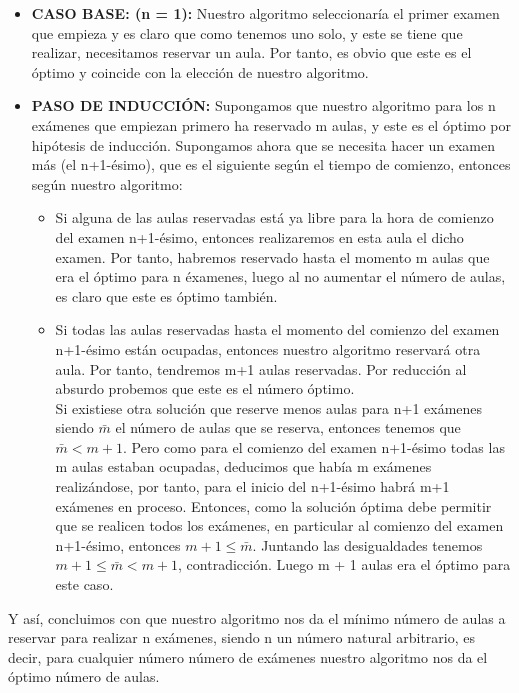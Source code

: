 \documentclass{article}
\begin{document}
    \begin{itemize}
        \item \textbf{CASO BASE: (n = 1): } Nuestro algoritmo seleccionaría el primer examen que empieza y es claro que como tenemos uno solo, y este se tiene que realizar, necesitamos reservar un aula. Por tanto, es obvio que este es el óptimo y coincide con la elección de nuestro algoritmo.

        \item \textbf{PASO DE INDUCCIÓN: } Supongamos que nuestro algoritmo para los n exámenes que empiezan primero ha reservado m aulas, y este es el óptimo por hipótesis de inducción. Supongamos ahora que se necesita hacer un examen más (el n+1-ésimo), que es el siguiente según el tiempo de comienzo, entonces según nuestro algoritmo: \\
        \begin{itemize}
            \item Si alguna de las aulas reservadas está ya libre para la hora de comienzo del examen n+1-ésimo, entonces realizaremos en esta aula el dicho examen. Por tanto, habremos reservado hasta el momento m aulas que era el óptimo para n éxamenes, luego al no aumentar el número de aulas, es claro que este es óptimo también.
            \item Si todas las aulas reservadas hasta el momento del comienzo del examen n+1-ésimo están ocupadas, entonces nuestro algoritmo reservará otra aula. Por tanto, tendremos m+1 aulas reservadas. Por reducción al absurdo probemos que este es el número óptimo. \\
            Si existiese otra solución que reserve menos aulas para n+1 exámenes siendo $\bar{m}$ el número de aulas que se reserva, entonces tenemos que $\bar{m} < m+1$. Pero como para el comienzo del examen n+1-ésimo todas las m aulas estaban ocupadas, deducimos que había m exámenes realizándose, por tanto, para el inicio del n+1-ésimo habrá m+1 exámenes en proceso. Entonces, como la solución óptima debe permitir que se realicen todos los exámenes, en particular al comienzo del examen n+1-ésimo, entonces $ m + 1 \leq \bar{m}$. Juntando las desigualdades tenemos $ m + 1 \leq \bar{m} < m + 1$, contradicción. Luego m + 1 aulas era el óptimo para este caso.
        \end{itemize}
        
    \end{itemize}

    Y así, concluimos con que nuestro algoritmo nos da el mínimo número de aulas a reservar para realizar n exámenes, siendo n un número natural arbitrario, es decir, para cualquier número número de exámenes nuestro algoritmo nos da el óptimo número de aulas.
\end{document}
